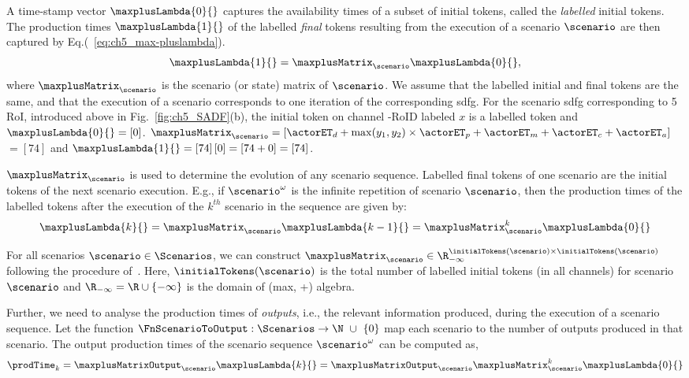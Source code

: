 A time-stamp vector $\maxplusLambda{0}{}$ captures the availability times of a subset of initial tokens, called the \emph{labelled} initial tokens.
The production times $ \maxplusLambda{1}{}$ of the labelled \emph{final} tokens resulting from the execution of a scenario $\scenario$ are then captured by Eq.(~\ref{eq:ch5_max-pluslambda}).
\begin{equation}
\label{eq:ch5_max-pluslambda}
  \maxplusLambda{1}{} = \maxplusMatrix_{\scenario} \maxplusLambda{0}{},
\end{equation}
where $\maxplusMatrix_{\scenario}$ is the scenario (or state) matrix of $\scenario$.
We assume that the labelled initial and final tokens are the same, and that the execution of a scenario corresponds to one iteration of the corresponding \gls{sdfg}. For the scenario \gls{sdfg} corresponding to 5 RoI, introduced above in Fig.\ \ref{fig:ch5_SADF}(b), the initial token on channel \taskA-RoID labeled $x$ is a labelled token and  $\maxplusLambda{0}{}=\left[ 0\right]$. 
$\maxplusMatrix_{\scenario}=\left[ \actorET_d+ \max (y_1,y_2)\times \actorET_p+\actorET_m+\actorET_c+\actorET_a\right]$ $=\left[ 74\right]$ and $\maxplusLambda{1}{}=\left[ 74\right]\left[ 0\right]=\left[ 74 + 0\right]=\left[ 74\right]$. 

$\maxplusMatrix_{\scenario}$ is used to determine the evolution of any scenario sequence. Labelled final tokens of one scenario are the initial tokens of the next scenario execution. E.g., if $\scenario^\omega$ is the infinite repetition of scenario $\scenario$, then the production times of the labelled tokens after the execution of the $k^{th}$ scenario in the sequence are given by:
%
\begin{equation}
\label{eq:ch5_max-plus-kth}
  \maxplusLambda{k}{}= \maxplusMatrix_{\scenario} \maxplusLambda{k-1}{} = \maxplusMatrix_{\scenario}^k \maxplusLambda{0}{} 
\end{equation}

For all scenarios $\scenario \in \Scenarios$, we can construct $\maxplusMatrix_{\scenario} \in \R_{-\infty}^{\initialTokens(\scenario) \times \initialTokens(\scenario)}$ following the procedure of~\cite{siyoum2014symbolic}.
Here, $\initialTokens(\scenario)$ is the total number of labelled initial tokens (in all channels) for scenario $\scenario$ and $\R_{-\infty}=\R\cup\{-\infty\}$ is the domain of (max, +) algebra.

Further, we need to analyse the production times of \emph{outputs}, i.e., the relevant information produced, during the execution of a scenario sequence.
Let the function $\FnScenarioToOutput:\Scenarios \rightarrow \N\ \cup\ \{0\}$ map each scenario to the number of outputs produced in that scenario.
The output production times of the scenario sequence $\scenario^\omega$ can be computed as,
\begin{equation}
 \label{eq:ch5_prod-times}
  \prodTime_k = \maxplusMatrixOutput_{\scenario} \maxplusLambda{k}{}=\maxplusMatrixOutput_{\scenario}\maxplusMatrix_{\scenario}^k \maxplusLambda{0}{} 
\end{equation}

